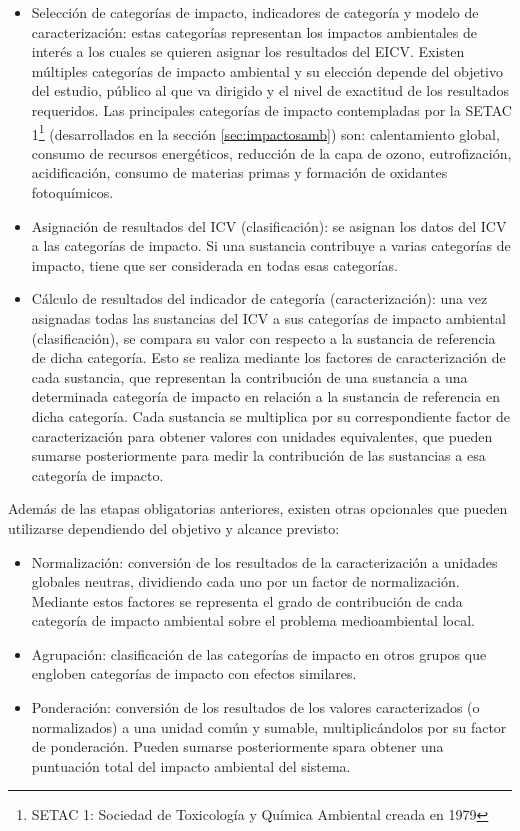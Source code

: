 \begin{itemize}
  \item Selección de categorías de impacto, indicadores de categoría y modelo de caracterización: estas categorías representan los impactos ambientales de interés a los cuales se quieren asignar los resultados del EICV. Existen múltiples categorías de impacto ambiental y su elección depende del objetivo del estudio, público al que va dirigido y el nivel de exactitud de los resultados requeridos. Las principales categorías de impacto contempladas por la SETAC 1\footnote{SETAC 1: Sociedad de Toxicología y Química Ambiental creada en 1979} (desarrollados en la sección \ref{sec:impactosamb}) son: calentamiento global, consumo de recursos energéticos, reducción de la capa de ozono, eutrofización, acidificación, consumo de materias primas y formación de oxidantes fotoquímicos.
  \item Asignación de resultados del ICV (clasificación): se asignan los datos del ICV a las categorías de impacto. Si una sustancia contribuye a varias categorías de impacto, tiene que ser considerada en todas esas categorías.
  \item Cálculo de resultados del indicador de categoría (caracterización): una vez asignadas todas las sustancias del ICV a sus categorías de impacto ambiental (clasificación), se compara su valor con respecto a la sustancia de referencia de dicha categoría. Esto se realiza mediante los factores de caracterización de cada sustancia, que representan la contribución de una sustancia a una determinada categoría de impacto en relación a la sustancia de referencia en dicha categoría. Cada sustancia se multiplica por su correspondiente factor de caracterización para obtener valores con unidades equivalentes, que pueden sumarse posteriormente para medir la contribución de las sustancias a esa categoría de impacto.
\end{itemize}

Además de las etapas obligatorias anteriores, existen otras opcionales que pueden utilizarse dependiendo del objetivo y alcance previsto:

\begin{itemize}
  \item Normalización: conversión de los resultados de la caracterización a unidades globales neutras, dividiendo cada uno por un factor de normalización. Mediante estos factores se representa el grado de contribución de cada categoría de impacto ambiental sobre el problema medioambiental local.
  \item Agrupación: clasificación de las categorías de impacto en otros grupos que engloben categorías de impacto con efectos similares.
  \item Ponderación: conversión de los resultados de los valores caracterizados (o normalizados) a una unidad común y sumable, multiplicándolos por su factor de ponderación. Pueden sumarse posteriormente spara obtener una puntuación total del impacto ambiental del sistema.
\end{itemize}


